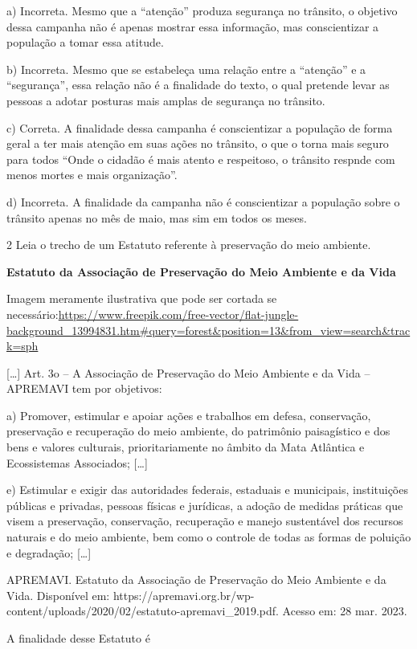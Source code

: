 \begin{itemize}
a) Incorreta. Mesmo que a ``atenção'' produza segurança no trânsito, o
objetivo dessa campanha não é apenas mostrar essa informação, mas
conscientizar a população a tomar essa atitude.

b) Incorreta. Mesmo que se estabeleça uma relação entre a ``atenção'' e
a ``segurança'', essa relação não é a finalidade do texto, o qual
pretende levar as pessoas a adotar posturas mais amplas de segurança no
trânsito.

c) Correta. A finalidade dessa campanha é conscientizar a população de
forma geral a ter mais atenção em suas ações no trânsito, o que o torna
mais seguro para todos ``Onde o cidadão é mais atento e respeitoso, o
trânsito respnde com menos mortes e mais organização''.

d) Incorreta. A finalidade da campanha não é conscientizar a população
sobre o trânsito apenas no mês de maio, mas sim em todos os meses.

\num{2} Leia o trecho de um Estatuto referente à preservação do meio
ambiente.

\textbf{Estatuto da Associação de Preservação do Meio Ambiente e da
Vida}

Imagem meramente ilustrativa que pode ser cortada se
necessário:\url{https://www.freepik.com/free-vector/flat-jungle-background_13994831.htm\#query=forest\&position=13\&from_view=search\&track=sph}

{[}\ldots{}{]} Art. 3o -- A Associação de Preservação do Meio Ambiente e
da Vida -- APREMAVI tem por objetivos:

a) Promover, estimular e apoiar ações e trabalhos em defesa,
conservação, preservação e recuperação do meio ambiente, do patrimônio
paisagístico e dos bens e valores culturais, prioritariamente no âmbito
da Mata Atlântica e Ecossistemas Associados; {[}\ldots{}{]}

e) Estimular e exigir das autoridades federais, estaduais e municipais,
instituições públicas e privadas, pessoas físicas e jurídicas, a adoção
de medidas práticas que visem a preservação, conservação, recuperação e
manejo sustentável dos recursos naturais e do meio ambiente, bem como o
controle de todas as formas de poluição e degradação; {[}\ldots{}{]}

APREMAVI. Estatuto da Associação de Preservação do Meio Ambiente e da
Vida. Disponível em:
https://apremavi.org.br/wp-content/uploads/2020/02/estatuto-apremavi\_2019.pdf.
Acesso em: 28 mar. 2023.

A finalidade desse Estatuto é


\end{itemize}
